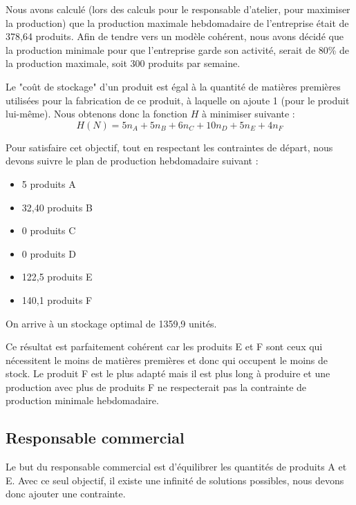 \documentclass[a4paper,10pt]{article}
\begin{document}
Nous avons calculé (lors des calculs pour le responsable d'atelier, pour maximiser la production) que la production maximale hebdomadaire de l'entreprise était de 378,64 produits. Afin de tendre vers un modèle cohérent, nous avons décidé que la production minimale pour que l'entreprise garde son activité, serait de 80\% de la production maximale, soit 300 produits par semaine.\newline


Le "coût de stockage" d'un produit est égal à la quantité de matières premières utilisées pour la fabrication de ce produit, à laquelle on ajoute 1 (pour le produit lui-même). Nous obtenons donc la fonction $H$ à minimiser suivante :
$$ H(N)=  5n_A + 5n_B + 6n_C +10n_D + 5n_E + 4n_F $$

Pour satisfaire cet objectif, tout en respectant les contraintes de départ, nous devons suivre le plan de production hebdomadaire suivant :\newline
\begin{itemize}
\item[\textbullet] 5 produits A
\item[\textbullet] 32,40 produits B
\item[\textbullet] 0 produits C
\item[\textbullet] 0 produits D
\item[\textbullet] 122,5 produits E
\item[\textbullet] 140,1 produits F\newline
\end{itemize}

On arrive à un stockage optimal de 1359,9 unités.

Ce résultat est parfaitement cohérent car les produits E et F sont ceux qui nécessitent le moins de matières premières et donc qui occupent le moins de stock. Le produit F est le plus adapté mais il est plus long à produire et une production avec plus de produits F ne respecterait pas la contrainte de production minimale hebdomadaire.


\subsection{Responsable commercial}

Le but du responsable commercial est d'équilibrer les quantités de produits A et E. Avec ce seul objectif, il existe une infinité de solutions possibles, nous devons donc ajouter une contrainte.
\end{document}
